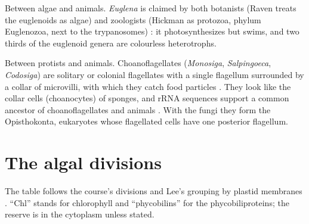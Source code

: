 Between algae and animals. \emph{Euglena} is
claimed by both botanists (Raven treats the
euglenoids as algae) and zoologists (Hickman
as protozoa, phylum Euglenozoa, next to the
trypanosomes) \cite[Chapter
15]{evert2013raven} \cite[Chapter
5]{hickman2002animal}: it photosynthesizes
but swims, and two thirds of the euglenoid
genera are colourless heterotrophs.

Between protists and animals.
Choanoflagellates (\emph{Monosiga},
\emph{Salpingoeca}, \emph{Codosiga}) are
solitary or colonial flagellates with a
single flagellum surrounded by a collar of
microvilli, with which they catch food
particles \cite[Chapter
25]{willey2008prescott}. They look like the
collar cells (choanocytes) of sponges, and
rRNA sequences support a common ancestor of
choanoflagellates and animals \cite[Chapter
6]{hickman2002animal}. With the fungi they
form the Opisthokonta, eukaryotes whose
flagellated cells have one posterior
flagellum.

\section{The algal divisions}
\label{section-divisions}

The table follows the course's divisions and
Lee's grouping by plastid membranes
\cite[Chapter 1 and Part
V]{lee2008phycology}. ``Chl'' stands for
chlorophyll and ``phycobilins'' for the
phycobiliproteins; the reserve is in the
cytoplasm unless stated.

